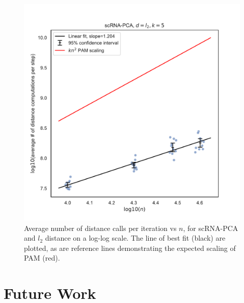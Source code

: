 \begin{figure}[ht!]
    \centering
    \includegraphics[scale=0.5]{figures/SCRNAPCA-L2-k5.pdf}
    \caption{Average number of distance calls per iteration vs $n$, for scRNA-PCA and $l_2$ distance on a log-log scale. The line of best fit (black) are plotted, as are reference lines demonstrating the expected scaling of PAM (red).} 
    \label{fig:SCRNAPCA-L2-scaling}
\end{figure}

\newpage
\clearpage
\section{Future Work}
\label{sec:future}


